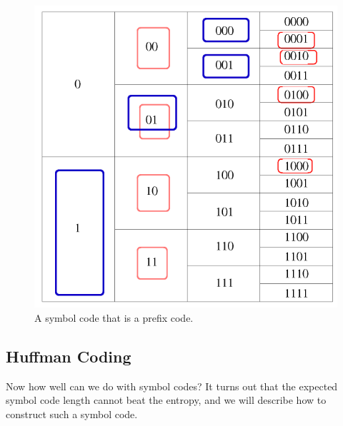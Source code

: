 \documentclass{article}
\begin{document}
    \begin{figure}[H]
      \centering 
      \includegraphics[scale=0.4]{img/supermarket_prefix.png}
      \caption{A symbol code that is a prefix code. } 
      \label{fig:supermarket_prefix}
    \end{figure}

  \subsection{Huffman Coding}

    Now how well can we do with symbol codes? It turns out that the expected symbol code length cannot beat the entropy, and we will describe how to construct such a symbol code. 
\end{document}
